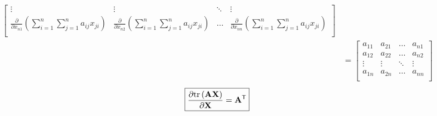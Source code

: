 \documentclass{article}
\newcommand{\trans}{\mathsf{T}}
\begin{document}
\begin{align*}
\begin{bmatrix}
        \vdots & \vdots & \ddots & \vdots \\
        \displaystyle \frac{\partial}{\partial x_{n1}} \left( \sum_{i = 1}^{n} \sum_{j = 1}^{n} a_{ij}x_{ji} \right) & 
        \displaystyle \frac{\partial}{\partial x_{n2}} \left( \sum_{i = 1}^{n} \sum_{j = 1}^{n} a_{ij}x_{ji} \right) & 
        \dots & 
        \displaystyle \frac{\partial}{\partial x_{nn}} \left( \sum_{i = 1}^{n} \sum_{j = 1}^{n} a_{ij}x_{ji} \right) \\
    \end{bmatrix} \\
    &= \begin{bmatrix}
            a_{11} & a_{21} & \dots & a_{n1} \\
            a_{12} & a_{22} & \dots & a_{n2} \\
            \vdots & \vdots & \ddots & \vdots \\
            a_{1n} & a_{2n} & \dots & a_{nn} \\
        \end{bmatrix}
\end{align*}
\begin{align}
    \boxed{\frac{\partial \textnormal{tr}\left(\mathbf{A} \mathbf{X}\right)}{\partial \mathbf{X}} = \mathbf{A}^\trans}
\end{align}
\end{document}
